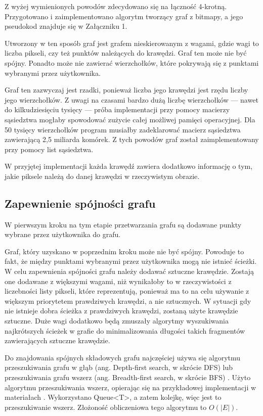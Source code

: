 \documentclass[a4paper,11pt,twoside,openright]{report}
\theoremstyle{definition}
\begin{document}
\bigskip

Z wyżej wymienionych powodów zdecydowano się na łączność 4-krotną. Przygotowano
i zaimplementowano algorytm tworzący graf z bitmapy, a jego pseudokod znajduje
się w Załączniku 1. %

Utworzony w ten sposób graf jest grafem nieskierowanym z wagami, gdzie wagi to
liczba pikseli, czy też punktów należących do krawędzi. Graf ten może nie być
spójny. Ponadto może nie zawierać wierzchołków, które pokrywają się z punktami
wybranymi przez użytkownika.

Graf ten zazwyczaj jest rzadki, ponieważ liczba jego krawędzi jest rzędu liczby
jego wierzchołków.  Z uwagi na czasami bardzo dużą liczbę wierzchołków --- nawet
do kilkudziesięciu tysięcy --- próba implementacji przy pomocy macierzy sąsiedztwa
mogłaby spowodować zużycie całej możliwej pamięci operacyjnej. Dla 50 tysięcy
wierzchołków program musiałby zadeklarować macierz sąsiedztwa zawierającą 2,5
miliarda komórek. Z tych powodów graf został zaimplementowany przy pomocy list sąsiedztwa.

W przyjętej implementacji każda krawędź zawiera dodatkowo informację o tym, jakie
piksele należą do danej krawędzi w rzeczywistym obrazie.

\subsection {Zapewnienie spójności grafu}

W pierwszym kroku na tym etapie przetwarzania grafu są dodawane punkty wybrane
przez użytkownika do grafu.

Graf, który uzyskano w poprzednim kroku może nie być spójny. Powoduje to fakt,
że między punktami wybranymi przez użytkownika mogą nie istnieć ścieżki. W celu
zapewnienia spójności grafu należy dodawać sztuczne krawędzie. Zostają one dodawane
z większymi wagami, niż wynikałoby to w rzeczywistości z liczebności listy pikseli,
które reprezentują, ponieważ ma to na celu używanie z większym priorytetem prawdziwych
krawędzi, a nie sztucznych. W sytuacji gdy nie istnieje dobra ścieżka z prawdziwych
krawędzi, zostaną użyte krawędzie sztuczne. Duże wagi dodatkowo będą zmuszały
algorytmy wyszukiwania najkrótszych ścieżek w grafie do minimalizowania długości
takich fragmentów zawierających sztuczne krawędzie.

Do znajdowania spójnych składowych grafu najczęściej używa się algorytmu
przeszukiwania grafu w głąb (ang. Depth-first search, w skrócie DFS) lub
przeszukiwania grafu wszerz (ang. Breadth-first search, w skrócie BFS)
\cite{Algorytmy Sedgewick}. Użyto algorytmu przeszukiwania wszerz, opierając się
na przykładowej implementacji w materiałach \cite{AiSD2}. Wykorzystano Queue<T>,
a zatem kolejkę, więc jest to przeszukiwanie wszerz. Złożoność obliczeniowa tego
algorytmu to $O(|E|)$.
\end{document}
